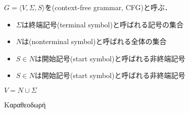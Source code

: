 \documentclass[../main.tex]{subfiles}
\begin{document}
\begin{figure}
    \centering
\end{figure}

\begin{definition} \(G = \langle V, \Sigma, S \rangle\)を(context-free grammar, CFG)と呼ぶ．
\begin{itemize}
    \item \(\Sigma\)は終端記号(terminal symbol)と呼ばれる記号の集合
    \item \(N\)は(nonterminal symbol)と呼ばれる全体の集合
    \item \(S \in N\)は開始記号(start symbol)と呼ばれる非終端記号
    \item \(S \in N\)は開始記号(start symbol)と呼ばれる非終端記号
\end{itemize}

\(V = N \cup \Sigma\)

\end{definition}

\textgreek{Καραθεοδωρή}
\end{document}
